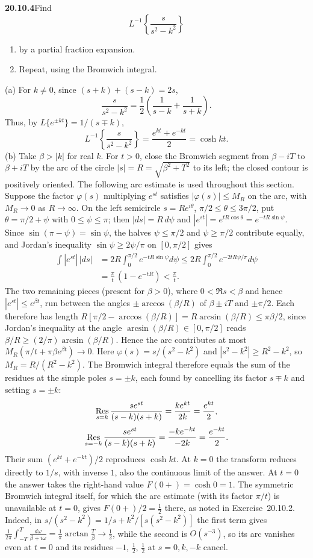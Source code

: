 \par\bigskip
\noindent\textbf{20.10.4}\quad Find
\[
L^{-1}\left\{\frac{s}{s^{2}-k^{2}}\right\}
\]
\begin{enumerate}
\item[(a)] by a partial fraction expansion.
\item[(b)] Repeat, using the Bromwich integral.
\end{enumerate}
\solution
(a) For $k\ne0$, since $(s+k)+(s-k)=2s$,
\[
\frac{s}{s^2-k^2}
=\frac12\left(\frac1{s-k}+\frac1{s+k}\right).
\]
Thus, by $L\{e^{\pm kt}\}=1/(s\mp k)$,
\[
\boxed{L^{-1}\left\{\frac{s}{s^2-k^2}\right\}
=\frac{e^{kt}+e^{-kt}}2=\cosh kt}.
\]
(b) Take $\beta>|k|$ for real $k$. For $t>0$, close the
Bromwich segment from $\beta-iT$ to $\beta+iT$ by the arc of
the circle $|s|=R=\sqrt{\beta^2+T^2}$ to its left; the closed
contour is positively oriented. The following arc estimate
is used throughout this section. Suppose the factor $\varphi(s)$
multiplying $e^{st}$ satisfies $|\varphi(s)|\le M_R$ on the
arc, with $M_R\to0$ as $R\to\infty$. On the left semicircle
$s=Re^{i\theta}$, $\pi/2\le\theta\le3\pi/2$, put
$\theta=\pi/2+\psi$ with $0\le\psi\le\pi$; then $|ds|=R\,d\psi$
and $|e^{st}|=e^{tR\cos\theta}=e^{-tR\sin\psi}$. Since
$\sin(\pi-\psi)=\sin\psi$, the halves $\psi\le\pi/2$ and
$\psi\ge\pi/2$ contribute equally, and Jordan's inequality
$\sin\psi\ge2\psi/\pi$ on $[0,\pi/2]$ gives
\begin{align*}
\int|e^{st}|\,|ds|&=2R\int_0^{\pi/2}e^{-tR\sin\psi}d\psi
\le2R\int_0^{\pi/2}e^{-2tR\psi/\pi}d\psi\\
&=\frac\pi t\,(1-e^{-tR})<\frac\pi t.
\end{align*}
The two remaining pieces (present for $\beta>0$), where
$0<\Re s<\beta$ and hence $|e^{st}|\le e^{\beta t}$, run
between the angles $\pm\arccos(\beta/R)$ of $\beta\pm iT$ and
$\pm\pi/2$. Each therefore has length
$R[\pi/2-\arccos(\beta/R)]=R\arcsin(\beta/R)\le\pi\beta/2$,
since Jordan's inequality at the angle
$\arcsin(\beta/R)\in[0,\pi/2]$ reads
$\beta/R\ge(2/\pi)\arcsin(\beta/R)$. Hence the arc contributes
at most $M_R(\pi/t+\pi\beta e^{\beta t})\to0$. Here
$\varphi(s)=s/(s^2-k^2)$ and $|s^2-k^2|\ge R^2-k^2$, so
$M_R=R/(R^2-k^2)$. The Bromwich integral therefore equals
the sum of the residues at the simple poles $s=\pm k$, each
found by cancelling its factor $s\mp k$ and setting $s=\pm k$:
\[
\mathop{\rm Res}_{s=k}\frac{se^{st}}{(s-k)(s+k)}
=\frac{ke^{kt}}{2k}=\frac{e^{kt}}2,
\]
\[
\mathop{\rm Res}_{s=-k}\frac{se^{st}}{(s-k)(s+k)}
=\frac{-ke^{-kt}}{-2k}=\frac{e^{-kt}}2.
\]
Their sum $(e^{kt}+e^{-kt})/2$ reproduces $\cosh kt$. At $k=0$
the transform reduces directly to $1/s$, with inverse $1$, also
the continuous limit of the answer. At $t=0$ the answer takes
the right-hand value $F(0+)=\cosh0=1$. The symmetric Bromwich
integral itself, for which the arc estimate (with its factor
$\pi/t$) is unavailable at $t=0$, gives $F(0+)/2=\frac12$
there, as noted in Exercise~20.10.2. Indeed, in
$s/(s^2-k^2)=1/s+k^2/[s(s^2-k^2)]$ the first term gives
$\frac1{2\pi}\int_{-T}^{T}\frac{d\omega}{\beta+i\omega}
=\frac1\pi\arctan\frac T\beta\to\frac12$, while the second is
$O(s^{-3})$, so its arc vanishes even at $t=0$ and its
residues $-1$, $\frac12$, $\frac12$ at $s=0,k,-k$ cancel.

